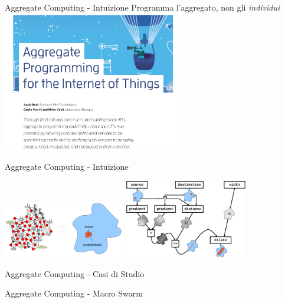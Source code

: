 \documentclass[presentation, 10pt,aspectratio=169]{beamer}\mode<presentation>{\usetheme{AMSBolognaFC}}
\begin{document}
\begin{frame}{Aggregate Computing - Intuizione}
	\centering
	\Large Programma l'\alert{aggregato}, non gli \emph{individui}
	\includegraphics[width=0.6\textwidth]{img/overview.png}
\end{frame}
\begin{frame}{Aggregate Computing - Intuizione}
	\begin{center}
		\includegraphics[width=0.4\textwidth]{img/ac.png}
		\includegraphics[width=0.4\textwidth]{img/channel.pdf}
	\end{center}
\end{frame}
\begin{frame}{Aggregate Computing - Casi di Studio}

\end{frame}
\begin{frame}{Aggregate Computing - Macro Swarm}

\end{frame}
\end{document}
